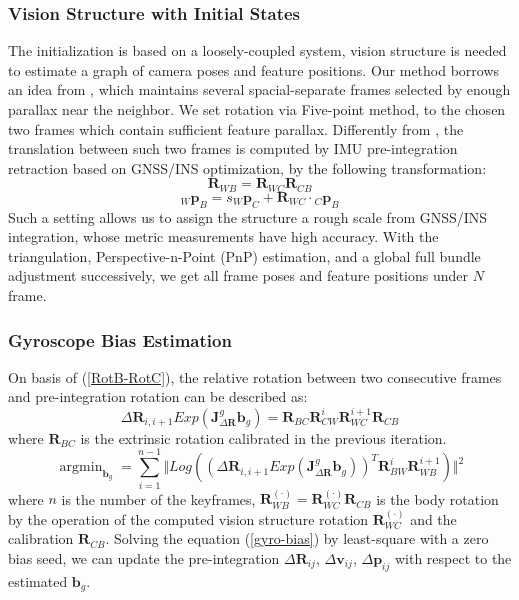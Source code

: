 \documentclass[journal,article,submit,moreauthors,pdftex]{Definitions/mdpi}
\begin{document}
\subsubsection{Vision Structure with Initial States}
The initialization is based on a loosely-coupled system, vision structure 
is needed to estimate a graph of camera poses and feature positions. 
Our method borrows an idea from \cite{qinRobustInitializationMonocular2017}, 
which maintains several spacial-separate frames selected by enough 
parallax near the neighbor. 
We set rotation via Five-point method, to the chosen two frames which 
contain sufficient feature parallax. 
Differently from \cite{qinRobustInitializationMonocular2017}, the 
translation between such two frames is computed by IMU pre-integration 
retraction \cite{dellaertFactorGraphsRobot2017} based on GNSS/INS 
optimization, by the following transformation:
\begin{equation}
	\boldsymbol{R}_{WB} = \boldsymbol{R}_{WC}\boldsymbol{R}_{CB}
	\label{RotB-RotC}
\end{equation} 
\begin{equation}
	{_W}\boldsymbol{p}_{B} = s{_W}\boldsymbol{p}_{C} + \boldsymbol{R}_{WC}\cdot{_C}\boldsymbol{p}_{B}
	\label{tranB-transC}
\end{equation}
Such a setting allows us to assign the structure a rough scale from 
GNSS/INS integration, whose metric measurements have high accuracy. 
With the triangulation, Perspective-n-Point (PnP) estimation, and a 
global full bundle adjustment successively, we get all frame poses and 
feature positions under $N$ frame.

\subsubsection{Gyroscope Bias Estimation}
On basis of (\ref{RotB-RotC}), the relative rotation between two 
consecutive frames and pre-integration rotation can be described as:
\begin{equation}
	\Delta{\boldsymbol{R}_{i,i+1}}Exp(\boldsymbol{J}_{\Delta{\boldsymbol{R}}}^g\boldsymbol{b}_g) = \boldsymbol{R}_{BC}\boldsymbol{R}_{CW}^{i}\boldsymbol{R}_{WC}^{i+1}\boldsymbol{R}_{CB}
\end{equation}
where $\boldsymbol{R}_{BC}$ is the extrinsic rotation calibrated in the 
previous iteration.
\begin{equation}
	\mathop{\arg\min}_{\boldsymbol{b}_g} = \sum_{i=1}^{n-1}\Vert Log \left( (\Delta{\boldsymbol{R}_{i,i+1}}Exp(\boldsymbol{J}_{\Delta{\boldsymbol{R}}}^g\boldsymbol{b}_g))^T \boldsymbol{R}_{BW}^{i}\boldsymbol{R}_{WB}^{i+1}  \right) \Vert^2
	\label{gyro-bias}
\end{equation}
where $n$ is the number of the keyframes, $\boldsymbol{R}_{WB}^{(\cdot)} = \boldsymbol{R}_{WC}^{(\cdot)}\boldsymbol{R}_{CB} $ is the body rotation by the operation of the computed vision structure rotation $\boldsymbol{R}_{WC}^{(\cdot)}$ and the calibration $\boldsymbol{R}_{CB}$. 
Solving the equation (\ref{gyro-bias}) by least-square with a zero bias 
seed, we can update the pre-integration $\Delta{\boldsymbol{R}_{ij}}$, 
$\Delta{\boldsymbol{v}_{ij}}$, $\Delta{\boldsymbol{p}_{ij}}$ with 
respect to the estimated $\boldsymbol{b}_g$. 
\end{document}
